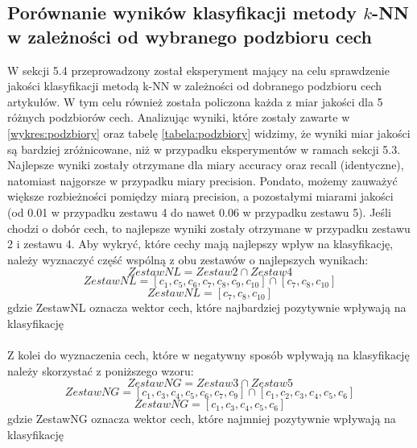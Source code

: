 \documentclass{classrep}
\begin{document}
\subsection{Porównanie wyników klasyfikacji metody $k$-NN w zależności od wybranego podzbioru cech}
W sekcji 5.4 przeprowadzony został eksperyment mający na celu sprawdzenie jakości klasyfikacji metodą k-NN w zależności od dobranego podzbioru cech artykułów. W tym celu również została policzona każda z miar jakości dla 5 różnych podzbiorów cech.  Analizując wyniki, które zostały zawarte w \ref{wykres:podzbiory} oraz tabelę \ref{tabela:podzbiory} widzimy, że wyniki miar jakości są bardziej zróżnicowane, niż w przypadku eksperymentów w ramach sekcji 5.3. Najlepsze wyniki zostały otrzymane dla miary accuracy oraz recall (identyczne), natomiast najgorsze w przypadku miary precision. Pondato, możemy zauważyć większe rozbieżności pomiędzy miarą precision, a pozostałymi miarami jakości (od 0.01 w przypadku zestawu 4 do nawet 0.06 w przypadku zestawu 5). Jeśli chodzi o dobór cech, to najlepsze wyniki zostały otrzymane w przypadku zestawu 2 i zestawu 4. Aby wykryć, które cechy mają najlepszy wpływ na klasyfikację, należy wyznaczyć część wspólną z obu zestawów o najlepszych wynikach: 
\begin{equation}
    ZestawNL = Zestaw2  \cap  Zestaw4
\end{equation}
\begin{equation}
    ZestawNL = [c_{1}, c_{5}, c_{6}, c_{7}, c_{8}, c_{9}, c_{10}] \cap [c_{7}, c_{8}, c_{10}]
\end{equation}
\begin{equation}
    ZestawNL = [c_{7}, c_{8}, c_{10}]
\end{equation}
	\indent gdzie ZestawNL oznacza wektor cech, które najbardziej pozytywnie wpływają na klasyfikację \\
\\ Z kolei do wyznaczenia cech, które w negatywny sposób wpływają na klasyfikację należy skorzystać z poniższego wzoru:
\begin{equation}
ZestawNG = Zestaw3  \cap  Zestaw5
\end{equation}
\begin{equation}
ZestawNG = [c_{1}, c_{3}, c_{4}, c_{5}, c_{6}, c_{7}, c_{9}] \cap [c_{1}, c_{2}, c_{3}, c_{4}, c_{5}, c_{6}]
\end{equation}
\begin{equation}
ZestawNG = [c_{1}, c_{3}, c_{4}, c_{5}, c_{6}]
\end{equation} 
	\indent gdzie ZestawNG oznacza wektor cech, które najmniej pozytywnie wpływają na klasyfikację \\ 
\end{document}
